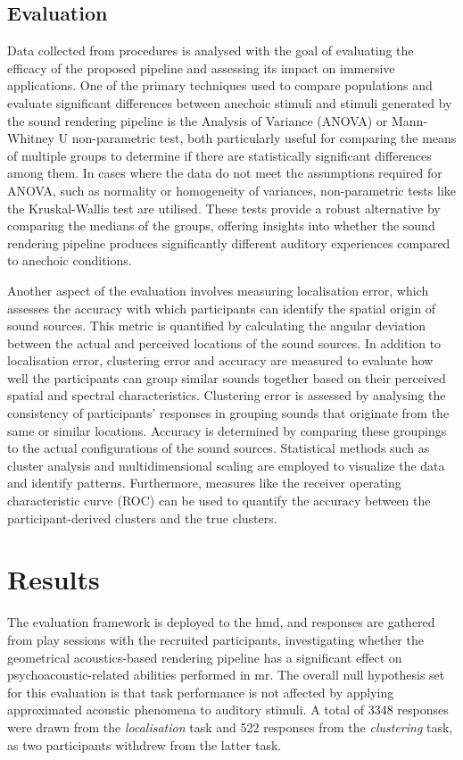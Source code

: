 \subsection{Evaluation}
Data collected from procedures is analysed with the goal of evaluating the efficacy of the proposed pipeline and assessing its impact on immersive applications. One of the primary techniques used to compare populations and evaluate significant differences between anechoic stimuli and stimuli generated by the sound rendering pipeline is the Analysis of Variance (ANOVA) or Mann-Whitney U non-parametric test, both particularly useful for comparing the means of multiple groups to determine if there are statistically significant differences among them. In cases where the data do not meet the assumptions required for ANOVA, such as normality or homogeneity of variances, non-parametric tests like the Kruskal-Wallis test are utilised. These tests provide a robust alternative by comparing the medians of the groups, offering insights into whether the sound rendering pipeline produces significantly different auditory experiences compared to anechoic conditions.\par
Another aspect of the evaluation involves measuring localisation error, which assesses the accuracy with which participants can identify the spatial origin of sound sources. This metric is quantified by calculating the angular deviation between the actual and perceived locations of the sound sources. In addition to localisation error, clustering error and accuracy are measured to evaluate how well the participants can group similar sounds together based on their perceived spatial and spectral characteristics. Clustering error is assessed by analysing the consistency of participants' responses in grouping sounds that originate from the same or similar locations. Accuracy is determined by comparing these groupings to the actual configurations of the sound sources. Statistical methods such as cluster analysis and multidimensional scaling are employed to visualize the data and identify patterns. Furthermore, measures like the receiver operating characteristic curve (ROC) can be used to quantify the accuracy between the participant-derived clusters and the true clusters.

\section{Results}
The evaluation framework is deployed to the \acrshort{hmd}, and responses are gathered from play sessions with the recruited participants, investigating whether the geometrical acoustics-based rendering pipeline has a significant effect on psychoacoustic-related abilities performed in \acrshort{mr}. The overall null hypothesis set for this evaluation is that task performance is not affected by applying approximated acoustic phenomena to auditory stimuli. A total of 3348 responses were drawn from the \emph{localisation} task and 522 responses from the \emph{clustering} task, as two participants withdrew from the latter task. \par

